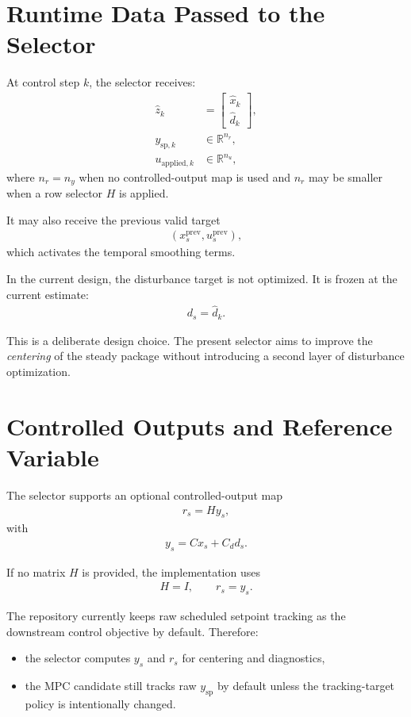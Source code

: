 \documentclass[11pt]{article}
\begin{document}
\section{Runtime Data Passed to the Selector}
At control step $k$, the selector receives:
\begin{align}
\hat z_k &= \begin{bmatrix}\hat x_k \\ \hat d_k\end{bmatrix}, \\
y_{\mathrm{sp},k} &\in \mathbb{R}^{n_r}, \\
u_{\mathrm{applied},k} &\in \mathbb{R}^{n_u},
\end{align}
where $n_r=n_y$ when no controlled-output map is used and $n_r$ may be smaller when a row selector $H$ is applied.

It may also receive the previous valid target
\begin{align}
(x_s^{\mathrm{prev}},u_s^{\mathrm{prev}}),
\end{align}
which activates the temporal smoothing terms.

In the current design, the disturbance target is not optimized. It is frozen at the current estimate:
\begin{align}
d_s = \hat d_k.
\end{align}

This is a deliberate design choice. The present selector aims to improve the \emph{centering} of the steady package without introducing a second layer of disturbance optimization.

\section{Controlled Outputs and Reference Variable}
The selector supports an optional controlled-output map
\begin{align}
r_s = H y_s,
\end{align}
with
\begin{align}
y_s = C x_s + C_d d_s.
\end{align}

If no matrix $H$ is provided, the implementation uses
\begin{align}
H = I, \qquad r_s = y_s.
\end{align}

The repository currently keeps raw scheduled setpoint tracking as the downstream control objective by default. Therefore:
\begin{itemize}
\item the selector computes $y_s$ and $r_s$ for centering and diagnostics,
\item the MPC candidate still tracks raw $y_{\mathrm{sp}}$ by default unless the tracking-target policy is intentionally changed.
\end{itemize}
\end{document}
